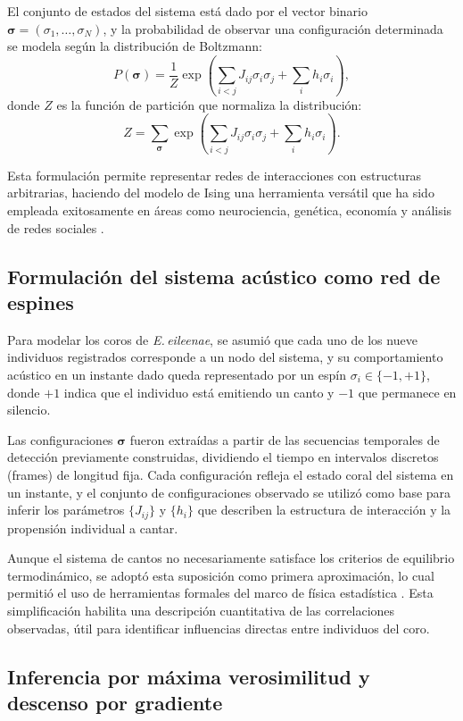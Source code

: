 El conjunto de estados del sistema está dado por el vector 
binario 
\(\boldsymbol{\sigma} = (\sigma_1, \dots, \sigma_N)\), y la 
probabilidad de observar una configuración determinada se modela 
según la distribución de Boltzmann:
\[
P(\boldsymbol{\sigma}) = \frac{1}{Z} \exp\left( \sum_{i<j} J_{ij} \sigma_i \sigma_j + \sum_{i} h_i \sigma_i \right),
\]
donde \( Z \) es la función de partición que normaliza la 
distribución:
\[
Z = \sum_{\boldsymbol{\sigma}} \exp\left( \sum_{i<j} J_{ij} \sigma_i \sigma_j + \sum_i h_i \sigma_i \right).
\]

Esta formulación permite representar redes de interacciones con 
estructuras arbitrarias, haciendo del modelo de Ising una 
herramienta versátil que ha sido empleada exitosamente en áreas 
como neurociencia, genética, economía y análisis de redes 
sociales \cite{chau2017inverse}.

\subsection{Formulación del sistema acústico como red de espines}

Para modelar los coros de \emph{E.\,eileenae}, se asumió que 
cada uno de los nueve individuos registrados corresponde a un 
nodo del sistema, y su comportamiento acústico en un instante 
dado queda representado por un espín \( \sigma_i \in \{-1, +1\} \), 
donde \( +1 \) indica que el individuo está emitiendo un canto 
y \( -1 \) que permanece en silencio.

Las configuraciones \(\boldsymbol{\sigma}\) fueron extraídas a 
partir de las secuencias temporales de detección previamente 
construidas, 
dividiendo el tiempo en intervalos discretos (frames) de 
longitud fija. Cada configuración refleja el estado coral del 
sistema en un instante, y el conjunto de configuraciones 
observado se utilizó como base para inferir los parámetros 
\( \{J_{ij}\} \) y \( \{h_i\} \) que describen la estructura de 
interacción y la propensión individual a cantar.

Aunque el sistema de cantos no necesariamente satisface los 
criterios de equilibrio termodinámico, se adoptó esta suposición 
como primera aproximación, lo cual permitió el uso de 
herramientas formales del marco de física estadística 
\cite{zeng2013maximum}. Esta simplificación habilita una 
descripción cuantitativa de las correlaciones observadas, útil 
para identificar influencias directas entre individuos del coro.

\subsection{Inferencia por máxima verosimilitud y descenso por 
gradiente}

